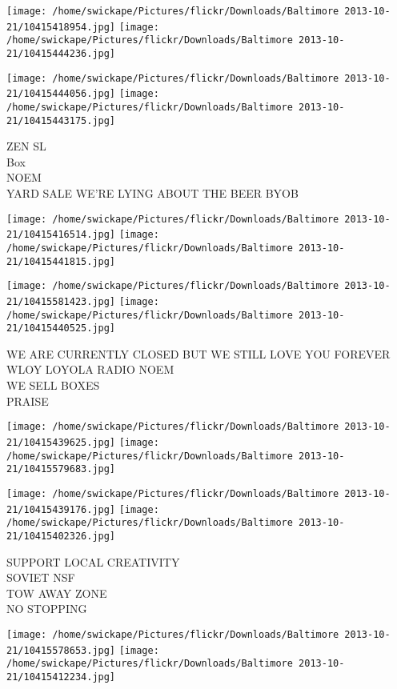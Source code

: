 \documentclass[10pt,letterpaper]{article}
\begin{document}
\texttt{[image: /home/swickape/Pictures/flickr/Downloads/Baltimore 2013-10-21/10415418954.jpg]}
\texttt{[image: /home/swickape/Pictures/flickr/Downloads/Baltimore 2013-10-21/10415444236.jpg]}

\texttt{[image: /home/swickape/Pictures/flickr/Downloads/Baltimore 2013-10-21/10415444056.jpg]}
\texttt{[image: /home/swickape/Pictures/flickr/Downloads/Baltimore 2013-10-21/10415443175.jpg]}

ZEN SL\\
Box\\
NOEM\\
YARD SALE WE'RE LYING ABOUT THE BEER BYOB\\
\pagebreak

\texttt{[image: /home/swickape/Pictures/flickr/Downloads/Baltimore 2013-10-21/10415416514.jpg]}
\texttt{[image: /home/swickape/Pictures/flickr/Downloads/Baltimore 2013-10-21/10415441815.jpg]}

\texttt{[image: /home/swickape/Pictures/flickr/Downloads/Baltimore 2013-10-21/10415581423.jpg]}
\texttt{[image: /home/swickape/Pictures/flickr/Downloads/Baltimore 2013-10-21/10415440525.jpg]}

WE ARE CURRENTLY CLOSED BUT WE STILL LOVE YOU FOREVER\\
WLOY LOYOLA RADIO NOEM\\
WE SELL BOXES\\
PRAISE\\
\pagebreak

\texttt{[image: /home/swickape/Pictures/flickr/Downloads/Baltimore 2013-10-21/10415439625.jpg]}
\texttt{[image: /home/swickape/Pictures/flickr/Downloads/Baltimore 2013-10-21/10415579683.jpg]}

\texttt{[image: /home/swickape/Pictures/flickr/Downloads/Baltimore 2013-10-21/10415439176.jpg]}
\texttt{[image: /home/swickape/Pictures/flickr/Downloads/Baltimore 2013-10-21/10415402326.jpg]}

SUPPORT LOCAL CREATIVITY\\
SOVIET NSF\\
TOW AWAY ZONE\\
NO STOPPING\\
\pagebreak

\texttt{[image: /home/swickape/Pictures/flickr/Downloads/Baltimore 2013-10-21/10415578653.jpg]}
\texttt{[image: /home/swickape/Pictures/flickr/Downloads/Baltimore 2013-10-21/10415412234.jpg]}
\end{document}
